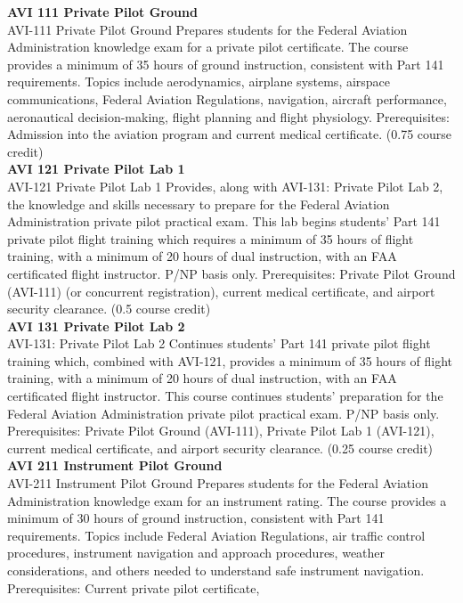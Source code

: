 \documentclass[
  letterpaper,
]{scrbook}
\begin{document}
\textbf{AVI 111 Private Pilot Ground}\\
AVI-111 Private Pilot Ground Prepares students for the Federal Aviation
Administration knowledge exam for a private pilot certificate. The
course provides a minimum of 35 hours of ground instruction, consistent
with Part 141 requirements. Topics include aerodynamics, airplane
systems, airspace communications, Federal Aviation Regulations,
navigation, aircraft performance, aeronautical decision-making, flight
planning and flight physiology. Prerequisites: Admission into the
aviation program and current medical certificate. (0.75 course credit)\\
\textbf{AVI 121 Private Pilot Lab 1}\\
AVI-121 Private Pilot Lab 1 Provides, along with AVI-131: Private Pilot
Lab 2, the knowledge and skills necessary to prepare for the Federal
Aviation Administration private pilot practical exam. This lab begins
students' Part 141 private pilot flight training which requires a
minimum of 35 hours of flight training, with a minimum of 20 hours of
dual instruction, with an FAA certificated flight instructor. P/NP basis
only. Prerequisites: Private Pilot Ground (AVI-111) (or concurrent
registration), current medical certificate, and airport security
clearance. (0.5 course credit)\\
\textbf{AVI 131 Private Pilot Lab 2}\\
AVI-131: Private Pilot Lab 2 Continues students' Part 141 private pilot
flight training which, combined with AVI-121, provides a minimum of 35
hours of flight training, with a minimum of 20 hours of dual
instruction, with an FAA certificated flight instructor. This course
continues students' preparation for the Federal Aviation Administration
private pilot practical exam. P/NP basis only. Prerequisites: Private
Pilot Ground (AVI-111), Private Pilot Lab 1 (AVI-121), current medical
certificate, and airport security clearance. (0.25 course credit)\\
\textbf{AVI 211 Instrument Pilot Ground}\\
AVI-211 Instrument Pilot Ground Prepares students for the Federal
Aviation Administration knowledge exam for an instrument rating. The
course provides a minimum of 30 hours of ground instruction, consistent
with Part 141 requirements. Topics include Federal Aviation Regulations,
air traffic control procedures, instrument navigation and approach
procedures, weather considerations, and others needed to understand safe
instrument navigation. Prerequisites: Current private pilot certificate,
\end{document}
